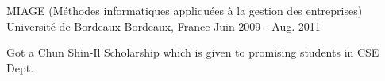

\begin{cventries}

  \cventry
    {MIAGE (Méthodes informatiques appliquées à la gestion des entreprises)} %
    {Université de Bordeaux} %
    {Bordeaux, France} %
    {Juin 2009 - Aug. 2011} %
    {
      \begin{cvitems} %
        \item {Got a Chun Shin-Il Scholarship which is given to promising students in CSE Dept.}
      \end{cvitems}
    }

\end{cventries}
